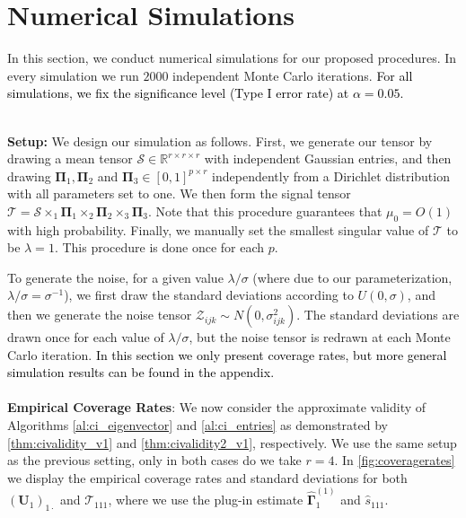 \documentclass[10pt]{article}
\newcommand{\0}{{\mathbf{0}}}
\newcommand{\1}{{\mathbf{1}}}
\newcommand{\U}{{\mathbf{U}}}
\newcommand{\inv}{^{-1}}
\renewcommand{\hat}{\widehat}
\renewcommand{\hat}{\widehat}
\newcommand{\red}{\color{red}}
\begin{document}
\section{Numerical Simulations}

\label{sec:simulations}


In this section, we conduct numerical simulations for our proposed procedures.  In every simulation we run $2000$ independent Monte Carlo iterations.  \textcolor{black}{For all simulations, we fix the significance level (Type I error rate) at $\alpha = 0.05$.}



    
\ \\ 
\noindent    
\textbf{Setup:} 
We design our simulation as follows.  First, we generate our tensor by drawing a mean tensor $\mathcal{S} \in \mathbb{R}^{r \times r \times r}$ with independent Gaussian entries, and then drawing $\mathbf{\Pi}_1,\mathbf{\Pi}_2$ and $\mathbf{\Pi}_3 \in [0,1]^{p \times r}$ independently from a Dirichlet distribution with all parameters set to one. We then form the signal tensor $\mathcal{T} = \mathcal{S} \times_1 \mathbf{\Pi}_1 \times_2 \mathbf{\Pi}_2 \times_3 \mathbf{\Pi}_3$.  Note that this procedure guarantees that $\mu_0 = O(1)$ with high probability.  Finally, we manually set the smallest singular value of $\mathcal{T}$ to be $\lambda = 1$.  This procedure is done once for each $p$.

To generate the noise, for a given value $\lambda/\sigma$ (where due to our parameterization, $\lambda/\sigma = \sigma\inv$), we first draw the standard deviations according to $U(0,\sigma)$, and then we generate the noise tensor $\mathcal{Z}_{ijk} \sim  N(0,\sigma^2_{ijk})$.  The standard deviations are drawn once for each value of $\lambda/\sigma$, but the noise tensor is redrawn at each Monte Carlo iteration. \textcolor{black}{In this section we only present coverage rates, but more general simulation results can be found in the appendix.}   %
\\ \ \\ \noindent
\textbf{Empirical Coverage Rates}: We now consider the approximate validity of Algorithms \ref{al:ci_eigenvector} and \ref{al:ci_entries} as demonstrated by \cref{thm:civalidity_v1} and \cref{thm:civalidity2_v1}, respectively.  We use the same setup as the previous setting, only in both cases do we take $r = 4$.  In \cref{fig:coveragerates} we display the empirical coverage rates and standard deviations for both  $(\U_{1})_{1\cdot}$ and $\mathcal{T}_{111}$, where we use the plug-in estimate $\mathbf{\hat \Gamma}_{1}^{(1)}$ and $\hat s_{111}$.
\end{document}
